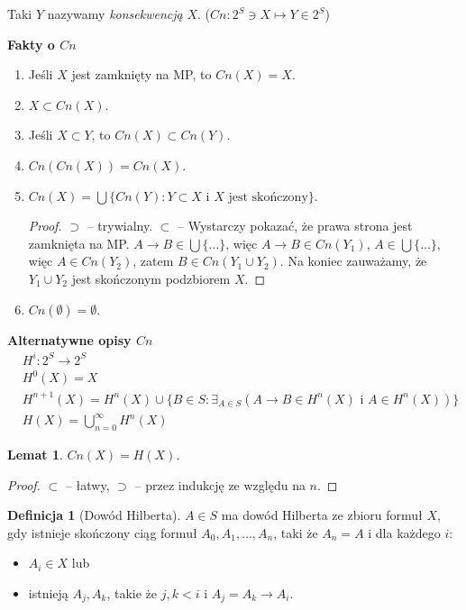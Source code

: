 \documentclass[10pt,a4paper]{article}
\theoremstyle{plain}
\newtheorem{lemma}{Lemat}
\theoremstyle{definition}
\newtheorem*{definition}{Definicja}
\newcommand{\impl}{\rightarrow}
\newcommand{\header}[1]{\noindent\textbf{#1}}
\begin{document}
Taki $Y$ nazywamy \emph{konsekwencją} $X$. ($Cn: 2^S \ni X \mapsto Y \in 2^S$)

\bigskip

\header{Fakty o $Cn$}

\begin{enumerate}
  \item Jeśli $X$ jest zamknięty na MP, to $Cn(X) = X$.
  \item $X \subset Cn(X)$.
  \item Jeśli $X \subset Y$, to $Cn(X) \subset Cn(Y)$.
  \item $Cn(Cn(X)) = Cn(X)$.
  \item $Cn(X) = \bigcup\{
    Cn(Y) : Y \subset X \text{ i } X \text{ jest skończony}
  \}$.
    \begin{proof}
      $\supset$ -- trywialny. $\subset$ -- Wystarczy pokazać, że prawa strona
      jest zamknięta na MP. $A \impl B \in \bigcup \{ \ldots \}$, więc
      $A \impl B \in Cn(Y_1)$, $A \in \bigcup \{ \ldots \}$, więc
      $A \in Cn(Y_2)$, zatem $B \in Cn(Y_1 \cup Y_2)$.
      Na koniec zauważamy, że $Y_1 \cup Y_2$ jest skończonym podzbiorem $X$.
    \end{proof}
  \item $Cn(\emptyset) = \emptyset$.
\end{enumerate}

\bigskip

\header{Alternatywne opisy $Cn$}
\begin{align*}
& H^i: 2^S \to 2^S\\
& H^0(X) = X\\
& H^{n+1}(X) = H^n(X) \cup \{
    B \in S : \exists_{A \in S} (A \impl B \in H^n(X) \text{ i } A \in H^n(X))
  \}\\
& H(X) = \bigcup_{n = 0}^\infty H^n(X)
\end{align*}

\begin{lemma}
$Cn(X) = H(X).$
\end{lemma}

\begin{proof}
$\subset$ -- łatwy, $\supset$ -- przez indukcję ze względu na $n$.
\end{proof}

\begin{definition}[Dowód Hilberta]
$A \in S$ ma dowód Hilberta ze zbioru formuł $X$, gdy istnieje skończony ciąg
formuł $A_0, A_1, \ldots, A_n$, taki że $A_n = A$ i dla każdego $i$:
\begin{itemize}
  \item $A_i \in X$ lub
  \item istnieją $A_j, A_k$, takie że $j, k < i$ i $A_j = A_k \impl A_i$.
\end{itemize}
\end{definition}
\end{document}

